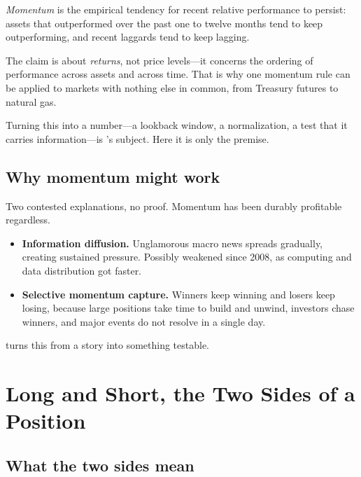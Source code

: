 \begin{definition}[Momentum]\label{def:momentum}
\emph{Momentum} is the empirical tendency for recent relative performance to persist: assets that
outperformed over the past one to twelve months tend to keep outperforming, and recent laggards tend
to keep lagging.
\end{definition}

\begin{note}
The claim is about \emph{returns}, not price levels---it concerns the ordering of performance across
assets and across time. That is why one momentum rule can be applied to markets with nothing else
in common, from Treasury futures to natural gas.
\end{note}

Turning this into a number---a lookback window, a normalization, a test that it carries
information---is 's subject. Here it is
only the premise.

\subsection{Why momentum might work}\label{sec:why-momentum-works}

Two contested explanations, no proof. Momentum has been durably profitable regardless.

\begin{itemize}
  \item \textbf{Information diffusion.} Unglamorous macro news spreads gradually, creating sustained
        pressure. Possibly weakened since 2008, as computing and data distribution got faster.
  \item \textbf{Selective momentum capture.} Winners keep winning and losers keep losing, because
        large positions take time to build and unwind, investors chase winners, and major events do
        not resolve in a single day.
\end{itemize}

 turns this from a story into something
testable.


\section{Long and Short, the Two Sides of a Position}\label{sec:long-and-short}

\subsection{What the two sides mean}\label{sec:two-sides}

